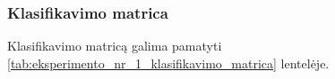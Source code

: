 \subsubsection{Klasifikavimo matrica}
\label{subsubsec:eksperimentas_nr_1_klasifikavimo_matrica}

Klasifikavimo matricą galima pamatyti \ref{tab:eksperimento_nr_1_klasifikavimo_matrica} lentelėje.

